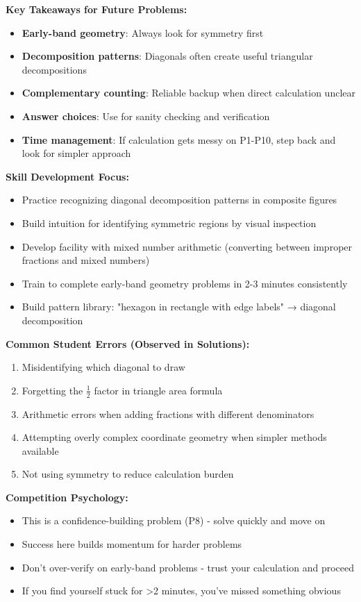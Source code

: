 \documentclass[11pt]{article}
\begin{document}
\textbf{Key Takeaways for Future Problems:}
\begin{itemize}
    \item \textbf{Early-band geometry}: Always look for symmetry first
    \item \textbf{Decomposition patterns}: Diagonals often create useful triangular decompositions
    \item \textbf{Complementary counting}: Reliable backup when direct calculation unclear
    \item \textbf{Answer choices}: Use for sanity checking and verification
    \item \textbf{Time management}: If calculation gets messy on P1-P10, step back and look for simpler approach
\end{itemize}

\textbf{Skill Development Focus:}
\begin{itemize}
    \item Practice recognizing diagonal decomposition patterns in composite figures
    \item Build intuition for identifying symmetric regions by visual inspection
    \item Develop facility with mixed number arithmetic (converting between improper fractions and mixed numbers)
    \item Train to complete early-band geometry problems in 2-3 minutes consistently
    \item Build pattern library: "hexagon in rectangle with edge labels" → diagonal decomposition
\end{itemize}

\textbf{Common Student Errors (Observed in Solutions):}
\begin{enumerate}
    \item Misidentifying which diagonal to draw
    \item Forgetting the $\frac{1}{2}$ factor in triangle area formula
    \item Arithmetic errors when adding fractions with different denominators
    \item Attempting overly complex coordinate geometry when simpler methods available
    \item Not using symmetry to reduce calculation burden
\end{enumerate}

\textbf{Competition Psychology:}
\begin{itemize}
    \item This is a confidence-building problem (P8) - solve quickly and move on
    \item Success here builds momentum for harder problems
    \item Don't over-verify on early-band problems - trust your calculation and proceed
    \item If you find yourself stuck for >2 minutes, you've missed something obvious
\end{itemize}
\end{document}
